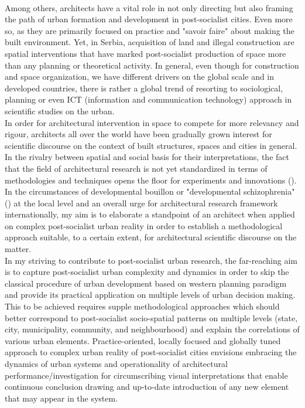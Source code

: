 \documentclass[11pt]{report}
\begin{document}
\\
Among others, architects have a vital role in not only directing but also framing the path of urban formation and development in post-socialist cities. Even more so, as they are primarily focused on practice and "savoir faire" about making the built environment. Yet, in Serbia, acquisition of land and illegal construction are spatial interventions that have marked post-socialist production of space more than any planning or theoretical activity. In general, even though for construction and space organization, we have different drivers on the global scale and in developed countries, there is rather a global trend of resorting to sociological, planning or even ICT (information and communication technology) approach in scientific studies on the urban. 
\\
In order for architectural intervention in space to compete for more relevancy and rigour,  architects all over the world have been gradually grown interest for scientific discourse on the context of built structures, spaces and cities in general.  In the rivalry between spatial and social basis for their interpretations, the fact that the field of architectural research is not yet standardized in terms of methodologies and techniques opens the floor for experiments and innovations (\href{ref}{\citealt{ref}}). In the circumstances of developmental bouillon or "developmental schizophrenia"(\href{Vujosevic}{\citealt{Vujosevic}}) at the local level and an overall urge for architectural research framework internationally, my aim is to elaborate a standpoint of an architect when applied on complex post-socialist urban reality in order to establish a methodological approach suitable, to a certain extent, for architectural scientific discourse on the matter.
\\
In my striving to contribute to post-socialist urban research, the far-reaching aim is to capture post-socialist urban complexity and dynamics in order to skip the classical procedure of urban development based on western planning paradigm and provide its practical application on multiple levels of urban decision making. This to be achieved requires supple methodological approaches which should better correspond to post-socialist socio-spatial patterns on multiple levels (state, city, municipality, community, and neighbourhood) and explain the correlations of various urban elements. Practice-oriented, locally focused and globally tuned approach to complex urban reality of post-socialist cities envisions embracing the dynamics of urban systems and operationality of architectural performance/investigation for circumscribing visual interpretations that enable continuous conclusion drawing and up-to-date introduction of any new element that may appear in the system.
\end{document}
